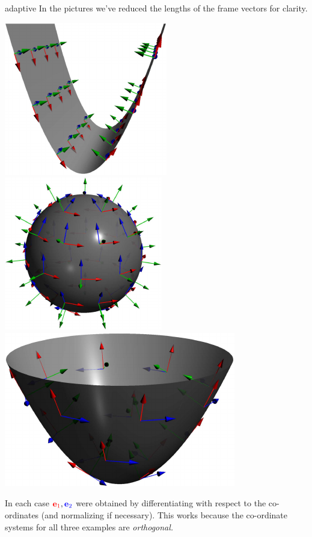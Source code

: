\begin{examples}{}{adaptive}
In the pictures we've reduced the lengths of the frame vectors for clarity.
	\begin{center}
		\href{http://www.math.uci.edu/~ndonalds/math162a/moving-paracyl.html}{\includegraphics[scale=0.9]{moving-paracyl}}
		\quad
		\href{http://www.math.uci.edu/~ndonalds/math162a/moving-sphere.html}{\includegraphics[scale=0.9]{moving-sphere}}
		\quad
		\href{http://www.math.uci.edu/~ndonalds/math162a/moving-paraboloid.html}{\includegraphics[scale=0.85]{moving-paraboloid}}
	\end{center}
	In each case $\textcolor{red}{{\mathbf{e}}_1}, \textcolor{blue}{{\mathbf{e}}_2}$ were obtained by differentiating with respect to the co-ordinates (and normalizing if necessary). This works because the co-ordinate systems for all three examples are \emph{orthogonal.}
\end{examples}


